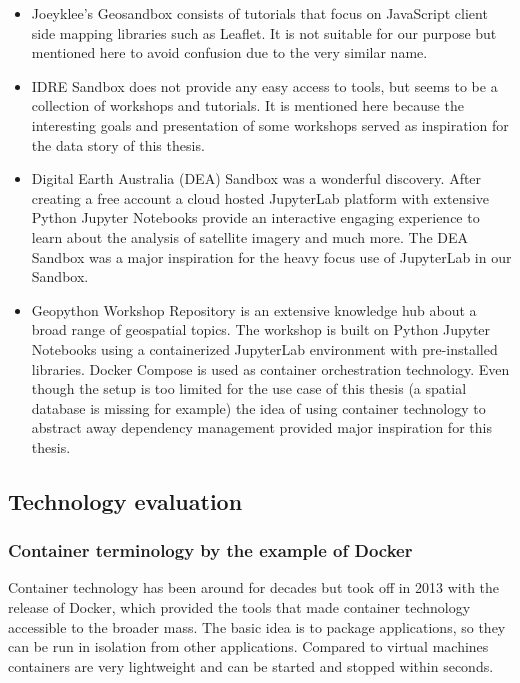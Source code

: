 \documentclass[11pt, a4paper, oneside, parskip=full-]{scrartcl}
\begin{document}
\begin{itemize}
  \item Joeyklee's Geosandbox\cite{project-joeyklee} consists of tutorials that
  focus on JavaScript client side mapping libraries such as Leaflet. It is not
  suitable for our purpose but mentioned here to avoid confusion due to the very
  similar name.
  \item IDRE Sandbox\cite{project-idre} does not provide any easy access to
  tools, but seems to be a collection of workshops and tutorials. It is
  mentioned here because the interesting goals and presentation of some
  workshops served as inspiration for the data story of this thesis.
  \item Digital Earth Australia (DEA) Sandbox\cite{project-dea} was a wonderful
  discovery. After creating a free account a cloud hosted
  JupyterLab\cite{jupyterlab} platform with extensive Python Jupyter Notebooks
  provide an interactive engaging experience to learn about the analysis of
  satellite imagery and much more. The DEA Sandbox was a major inspiration for
  the heavy focus use of JupyterLab in our Sandbox.
  \item Geopython Workshop Repository\cite{project-geopython} is an extensive
  knowledge hub about a broad range of geospatial topics. The workshop is built
  on Python Jupyter Notebooks using a containerized JupyterLab environment with
  pre-installed libraries. Docker Compose\cite{dockercompose} is used as
  container orchestration technology. Even though the setup is too limited for
  the use case of this thesis (a spatial database is missing for example) the
  idea of using container technology to abstract away dependency management
  provided major inspiration for this thesis.
\end{itemize}

\subsection{Technology evaluation}

\subsubsection{Container terminology by the example of Docker}
Container technology has been around for decades but took off in 2013 with the
release of Docker, which provided the tools that made container technology
accessible to the broader mass. The basic idea is to package applications, so
they can be run in isolation from other applications. Compared to virtual
machines containers are very lightweight and can be started and stopped within
seconds.
\end{document}
